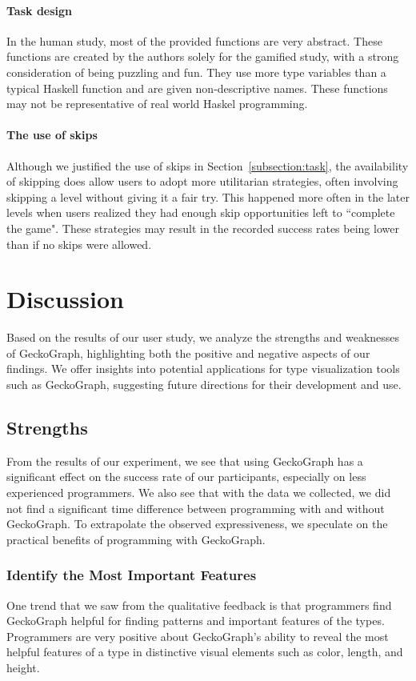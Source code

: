 \paragraph{Task design}
In the human study, most of the provided functions are very abstract. These functions are created by the authors solely for the gamified study, with a strong consideration of being puzzling and fun. They use more type variables than a typical Haskell function and are given non-descriptive names. These functions may not be representative of real world Haskel programming. 


\paragraph{The use of skips}
Although we justified the use of skips in Section~\ref{subsection:task}, the availability of skipping does allow users to adopt more utilitarian strategies, often involving skipping a level without giving it a fair try. This happened more often in the later levels when users realized they had enough skip opportunities left to ``complete the game". These strategies may result in the recorded success rates being lower than if no skips were allowed.



\section{Discussion} 
Based on the results of our user study, we analyze the strengths and weaknesses of GeckoGraph, highlighting both the positive and negative aspects of our findings. We offer insights into potential applications for type visualization tools such as GeckoGraph, suggesting future directions for their development and use.


\label{sec:gecko-discussion}
\subsection{Strengths}
From the results of our experiment, we see that using GeckoGraph has a significant effect on the success rate of our participants, especially on less experienced programmers. We also see that with the data we collected, we did not find a significant time difference between programming with and without GeckoGraph. To extrapolate the observed expressiveness, we speculate on the practical benefits of programming with GeckoGraph.

\subsubsection{Identify the Most Important Features}
One trend that we saw from the qualitative feedback is that programmers find GeckoGraph helpful for finding patterns and important features of the types. Programmers are very positive about GeckoGraph's ability to reveal the most helpful features of a type in distinctive visual elements such as color, length, and height.

